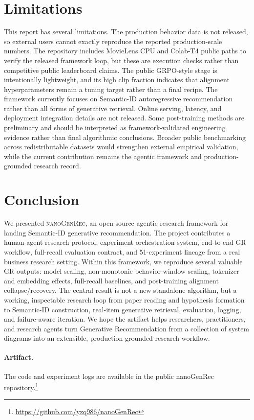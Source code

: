 \documentclass[11pt]{article}
\begin{document}
\section{Limitations}

This report has several limitations. The production behavior data is not released, so external users cannot exactly reproduce the reported production-scale numbers. The repository includes MovieLens CPU and Colab-T4 public paths to verify the released framework loop, but these are execution checks rather than competitive public leaderboard claims. The public GRPO-style stage is intentionally lightweight, and its high clip fraction indicates that alignment hyperparameters remain a tuning target rather than a final recipe. The framework currently focuses on Semantic-ID autoregressive recommendation rather than all forms of generative retrieval. Online serving, latency, and deployment integration details are not released. Some post-training methods are preliminary and should be interpreted as framework-validated engineering evidence rather than final algorithmic conclusions. Broader public benchmarking across redistributable datasets would strengthen external empirical validation, while the current contribution remains the agentic framework and production-grounded research record.

\section{Conclusion}

We presented \textsc{nanoGenRec}, an open-source agentic research framework for landing Semantic-ID generative recommendation. The project contributes a human-agent research protocol, experiment orchestration system, end-to-end GR workflow, full-recall evaluation contract, and 51-experiment lineage from a real business research setting. Within this framework, we reproduce several valuable GR outputs: model scaling, non-monotonic behavior-window scaling, tokenizer and embedding effects, full-recall baselines, and post-training alignment collapse/recovery. The central result is not a new standalone algorithm, but a working, inspectable research loop from paper reading and hypothesis formation to Semantic-ID construction, real-item generative retrieval, evaluation, logging, and failure-aware iteration. We hope the artifact helps researchers, practitioners, and research agents turn Generative Recommendation from a collection of system diagrams into an extensible, production-grounded research workflow.

\paragraph{Artifact.}
The code and experiment logs are available in the public nanoGenRec repository.\footnote{\url{https://github.com/yzq986/nanoGenRec}}



\end{document}
